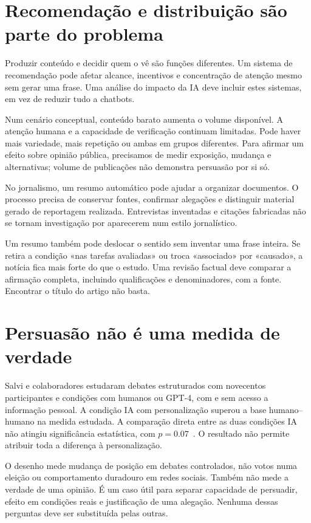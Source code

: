 \section{Recomendação e distribuição são parte do problema}
Produzir conteúdo e decidir quem o vê são funções diferentes. Um sistema de recomendação pode afetar alcance, incentivos e concentração de atenção mesmo sem gerar uma frase. Uma análise do impacto da IA deve incluir estes sistemas, em vez de reduzir tudo a chatbots.

Num cenário conceptual, conteúdo barato aumenta o volume disponível. A atenção humana e a capacidade de verificação continuam limitadas. Pode haver mais variedade, mais repetição ou ambas em grupos diferentes. Para afirmar um efeito sobre opinião pública, precisamos de medir exposição, mudança e alternativas; volume de publicações não demonstra persuasão por si só.

No jornalismo, um resumo automático pode ajudar a organizar documentos. O processo precisa de conservar fontes, confirmar alegações e distinguir material gerado de reportagem realizada. Entrevistas inventadas e citações fabricadas não se tornam investigação por aparecerem num estilo jornalístico.

Um resumo também pode deslocar o sentido sem inventar uma frase inteira. Se retira a condição «nas tarefas avaliadas» ou troca «associado» por «causado», a notícia fica mais forte do que o estudo. Uma revisão factual deve comparar a afirmação completa, incluindo qualificações e denominadores, com a fonte. Encontrar o título do artigo não basta.

\section{Persuasão não é uma medida de verdade}
Salvi e colaboradores estudaram debates estruturados com novecentos participantes e condições com humanos ou GPT-4, com e sem acesso a informação pessoal. A condição IA com personalização superou a base humano--humano na medida estudada. A comparação direta entre as duas condições IA não atingiu significância estatística, com $p=0.07$~\citep{salvi2025}. O resultado não permite atribuir toda a diferença à personalização.

O desenho mede mudança de posição em debates controlados, não votos numa eleição ou comportamento duradouro em redes sociais. Também não mede a verdade de uma opinião. É um caso útil para separar capacidade de persuadir, efeito em condições reais e justificação de uma alegação. Nenhuma dessas perguntas deve ser substituída pelas outras.

